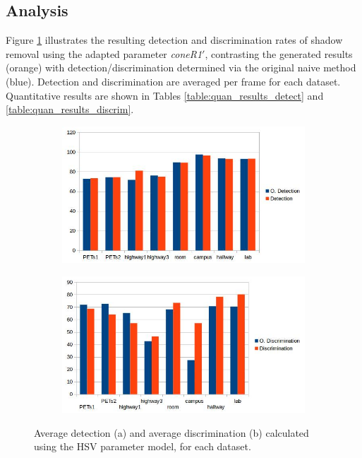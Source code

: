 \subsection{Analysis}

Figure \ref{fig:bars_hsv_calc} illustrates the resulting detection and discrimination rates of shadow removal using the adapted parameter \textit{coneR1}$'$, contrasting the generated results (orange) with detection/discrimination determined via the original naive method (blue). Detection and discrimination are averaged per frame for each dataset. Quantitative results are shown in Tables \ref{table:quan_results_detect} and \ref{table:quan_results_discrim}.

\begin{figure}
\centering
\begin{subfigure}{1\linewidth}
  \includegraphics[width=1\linewidth]{figures/model/detect_hsv.jpg}
  \caption{}
\end{subfigure}
\hfill
\begin{subfigure}{1\linewidth}
  \includegraphics[width=1\linewidth]{figures/model/discrim_hsv.jpg}
  \caption{}
\end{subfigure}

\caption{Average detection (a) and average discrimination (b) calculated using the HSV parameter model, for each dataset.}
\label{fig:bars_hsv_calc}
\end{figure}

